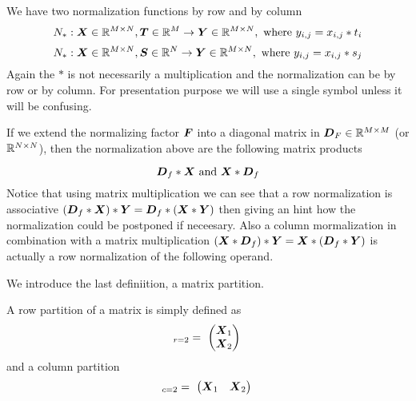 \documentclass[acmsmall]{acmart}
\begin{document}
\begin{definition}
  We have two normalization functions by row and by column
  \begin{equation}
    N_*: {\boldsymbol X}\in\mathbb{R}^{M\times N}, {\boldsymbol T}\in \mathbb{R}^M \rightarrow {\boldsymbol Y}
    \in \mathbb{R}^{M\times N}, \text{ where } y_{i,j} = x_{i,j}*t_i
  \end{equation}
  \begin{equation}
    N_*: {\boldsymbol X}\in\mathbb{R}^{M\times N}, {\boldsymbol S}\in \mathbb{R}^N \rightarrow {\boldsymbol Y}
    \in \mathbb{R}^{M\times N}, \text{ where } y_{i,j} = x_{i,j}*s_j
  \end{equation}
  Again the $*$ is not necessarily a multiplication and the
  normalization can be by row or by column. For presentation purpose
  we will use a single symbol unless it will be confusing.
\end{definition}

If we extend the normalizing factor ${\boldsymbol F}$ into a diagonal matrix in
${\boldsymbol D}_F \in  \mathbb{R}^{M\times M}$ (or $\mathbb{R}^{N\times N}$), then the normalization above
are the following matrix products

\begin{equation}
  {\boldsymbol D}_f * {\boldsymbol X} \text{ and }  {\boldsymbol X} * {\boldsymbol D}_f 
\end{equation}
Notice that using matrix multiplication we can see that a row
normalization is associative $({\boldsymbol D}_f * {\boldsymbol X}) * {\boldsymbol Y} = {\boldsymbol D}_f
* ({\boldsymbol X} * {\boldsymbol Y})$ then giving an hint how the normalization could
be postponed if neceesary.  Also a column mormalization in combination
with a matrix multiplication $({\boldsymbol X}* {\boldsymbol D}_f) * {\boldsymbol Y} = {\boldsymbol X}*
({\boldsymbol D}_f * {\boldsymbol Y})$ is actually a row normalization of the following
operand.

We introduce the last definiition, a matrix partition.
\begin{definition}
  A row partition of a matrix is simply defined as
  \begin{equation}
    [\Vc{X} ]_{r=2} = \
    \begin{pmatrix}
      \Vc{X}_1  \\
      \Vc{X}_2  \\
    \end{pmatrix}\\
  \end{equation}
  and a column partition
  \begin{equation}
    [\Vc{X} ]_{c=2} = \
    \begin{pmatrix}
      \Vc{X}_1  & \Vc{X}_2  \\
    \end{pmatrix}\\
  \end{equation}
\end{definition}
\end{document}
